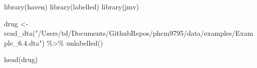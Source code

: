 \documentclass[
]{memoir}
\newenvironment{Shaded}{\begin{snugshade}}{\end{snugshade}}
\newcommand{\FunctionTok}[1]{\textcolor[rgb]{0.00,0.00,0.00}{#1}}
\newcommand{\NormalTok}[1]{#1}
\newcommand{\OtherTok}[1]{\textcolor[rgb]{0.56,0.35,0.01}{#1}}
\newcommand{\SpecialCharTok}[1]{\textcolor[rgb]{0.00,0.00,0.00}{#1}}
\newcommand{\StringTok}[1]{\textcolor[rgb]{0.31,0.60,0.02}{#1}}
\begin{document}
\begin{Shaded}
\begin{Highlighting}[]
\FunctionTok{library}\NormalTok{(haven)}
\FunctionTok{library}\NormalTok{(labelled)}
\FunctionTok{library}\NormalTok{(jmv)}

\NormalTok{drug }\OtherTok{\textless{}{-}} \FunctionTok{read\_dta}\NormalTok{(}\StringTok{"/Users/td/Documents/GithubRepos/phcm9795/data/examples/Example\_6.4.dta"}\NormalTok{) }\SpecialCharTok{\%\textgreater{}\%} 
  \FunctionTok{unlabelled}\NormalTok{()}

\FunctionTok{head}\NormalTok{(drug)}
\end{Highlighting}
\end{Shaded}

 
  \providecommand{\huxb}[2]{\arrayrulecolor[RGB]{#1}\global\arrayrulewidth=#2pt}
  \providecommand{\huxvb}[2]{\color[RGB]{#1}\vrule width #2pt}
  \providecommand{\huxtpad}[1]{\rule{0pt}{#1}}
  \providecommand{\huxbpad}[1]{\rule[-#1]{0pt}{#1}}
\end{document}
